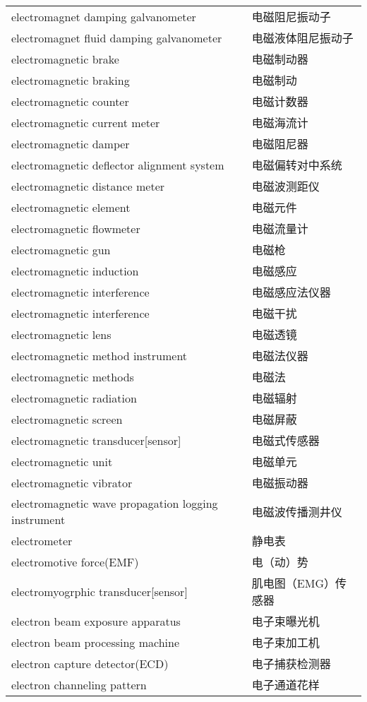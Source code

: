 \documentclass[
]{article}
\begin{document}
\begin{longtable}[]{@{}ll@{}}
electromagnet damping galvanometer & 电磁阻尼振动子 \\
electromagnet fluid damping galvanometer & 电磁液体阻尼振动子 \\
electromagnetic brake & 电磁制动器 \\
electromagnetic braking & 电磁制动 \\
electromagnetic counter & 电磁计数器 \\
electromagnetic current meter & 电磁海流计 \\
electromagnetic damper & 电磁阻尼器 \\
electromagnetic deflector alignment system & 电磁偏转对中系统 \\
electromagnetic distance meter & 电磁波测距仪 \\
electromagnetic element & 电磁元件 \\
electromagnetic flowmeter & 电磁流量计 \\
electromagnetic gun & 电磁枪 \\
electromagnetic induction & 电磁感应 \\
electromagnetic interference & 电磁感应法仪器 \\
electromagnetic interference & 电磁干扰 \\
electromagnetic lens & 电磁透镜 \\
electromagnetic method instrument & 电磁法仪器 \\
electromagnetic methods & 电磁法 \\
electromagnetic radiation & 电磁辐射 \\
electromagnetic screen & 电磁屏蔽 \\
electromagnetic transducer{[}sensor{]} & 电磁式传感器 \\
electromagnetic unit & 电磁单元 \\
electromagnetic vibrator & 电磁振动器 \\
electromagnetic wave propagation logging instrument &
电磁波传播测井仪 \\
electrometer & 静电表 \\
electromotive force(EMF) & 电（动）势 \\
electromyogrphic transducer{[}sensor{]} & 肌电图（EMG）传感器 \\
electron beam exposure apparatus & 电子束曝光机 \\
electron beam processing machine & 电子束加工机 \\
electron capture detector(ECD) & 电子捕获检测器 \\
electron channeling pattern & 电子通道花样 \\

\end{longtable}
\end{document}
